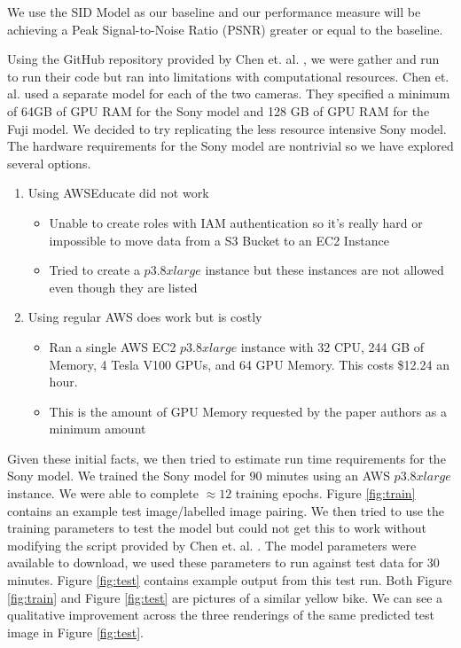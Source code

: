 \documentclass{article}
\begin{document}
We use the SID Model as our baseline and our performance measure will be achieving a Peak Signal-to-Noise Ratio (PSNR) greater or equal to the baseline.

Using the GitHub repository provided by Chen et. al. \cite{chen2018learning},
we were gather and run to run their code but ran into limitations with computational
resources. Chen et. al. \cite{chen2018learning} used a separate model for
each of the two cameras. They specified a minimum of 64GB of GPU RAM for the
Sony model and 128 GB of GPU RAM for the Fuji model. We decided to try
replicating the less resource intensive Sony model. The hardware
requirements for the Sony model are nontrivial so we have explored
several options.

\begin{enumerate}
\item Using AWSEducate did not work
  \begin{itemize}
    \item Unable to create roles with IAM authentication so it's really
	 hard or impossible to move data from a S3 Bucket to an EC2 Instance
    \item Tried to create a $p3.8xlarge$ instance but these instances are
      not allowed even though they are listed
  \end{itemize}
\item Using regular AWS does work but is costly
  \begin{itemize}
    \item Ran a single AWS EC2 $p3.8xlarge$ instance with 32 CPU, 244 GB of
	 Memory, 4 Tesla V100 GPUs, and 64 GPU Memory. This costs \$12.24
	 an hour.
    \item This is the amount of GPU Memory requested by the paper
      authors as a minimum amount
    \end{itemize}
\end{enumerate}

Given these initial facts, we then tried to estimate run time requirements
for the Sony model. We trained the Sony model for 90 minutes using an
AWS $p3.8xlarge$ instance. We were able to complete $\approx 12$ training
epochs. Figure \ref{fig:train} contains an example test image/labelled image
pairing. We then tried to use the training parameters to
test the model but could not get this to work without modifying the script
provided by Chen et. al. \cite{chen2018learning}. The model parameters
were available to download, we used these parameters to run against test
data for 30 minutes. Figure \ref{fig:test} contains example output from this
test run. Both Figure \ref{fig:train} and Figure \ref{fig:test}
are pictures of a similar yellow bike. We can see a qualitative improvement
across the three renderings of the same predicted test image in
Figure \ref{fig:test}.
\end{document}

